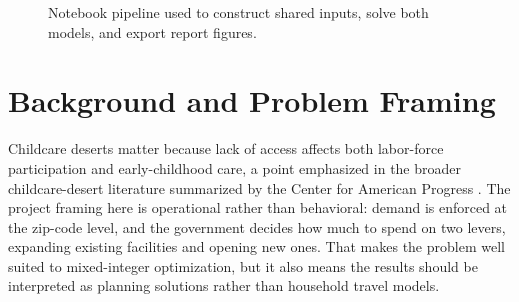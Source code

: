 \documentclass[11pt]{article}
\begin{document}
\begin{figure}[H]
\centering
{}
\caption{Notebook pipeline used to construct shared inputs, solve both models, and export report figures.}
\label{fig:code-pipeline-aligned}
\end{figure}

\section{Background and Problem Framing}

Childcare deserts matter because lack of access affects both labor-force participation and early-childhood care, a point emphasized in the broader childcare-desert literature summarized by the Center for American Progress \cite{americanprogress}. The project framing here is operational rather than behavioral: demand is enforced at the zip-code level, and the government decides how much to spend on two levers, expanding existing facilities and opening new ones. That makes the problem well suited to mixed-integer optimization, but it also means the results should be interpreted as planning solutions rather than household travel models.
\end{document}
